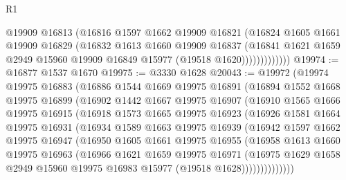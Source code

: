 \begin{lexlean}{R1}
\begin{coremodule}
                    @19909
                    @16813
                    (@16816
                      @1597
                      @1662
                      @19909
                      @16821
                      (@16824
                        @1605
                        @1661
                        @19909
                        @16829
                        (@16832
                          @1613
                          @1660
                          @19909
                          @16837
                          (@16841
                            @1621
                            @1659
                            @2949
                            @15960
                            @19909
                            @16849
                            @15977
                            (@19518 @1620)))))))))))))
@19974 := @16877 @1537 @1670
@19975 := @3330 @1628
@20043 := @19972
    (@19974
      @19975
      @16883
      (@16886
        @1544
        @1669
        @19975
        @16891
        (@16894
          @1552
          @1668
          @19975
          @16899
          (@16902
            @1442
            @1667
            @19975
            @16907
            (@16910
              @1565
              @1666
              @19975
              @16915
              (@16918
                @1573
                @1665
                @19975
                @16923
                (@16926
                  @1581
                  @1664
                  @19975
                  @16931
                  (@16934
                    @1589
                    @1663
                    @19975
                    @16939
                    (@16942
                      @1597
                      @1662
                      @19975
                      @16947
                      (@16950
                        @1605
                        @1661
                        @19975
                        @16955
                        (@16958
                          @1613
                          @1660
                          @19975
                          @16963
                          (@16966
                            @1621
                            @1659
                            @19975
                            @16971
                            (@16975
                              @1629
                              @1658
                              @2949
                              @15960
                              @19975
                              @16983
                              @15977
                              (@19518 @1628))))))))))))))

\end{coremodule}
\end{lexlean}
